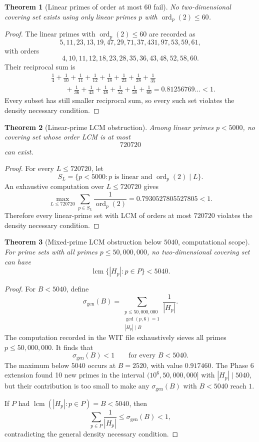 \documentclass[11pt]{article}
\newtheorem{theorem}{Theorem}[section]
\theoremstyle{definition}
\theoremstyle{remark}
\DeclareMathOperator{\ord}{ord}
\DeclareMathOperator{\lcm}{lcm}
\begin{document}
\begin{theorem}[Linear primes of order at most \(60\) fail]
No two-dimensional covering set exists using only linear primes \(p\) with
\(\ord_p(2)\leq 60\).
\end{theorem}

\begin{proof}
The linear primes with \(\ord_p(2)\leq 60\) are recorded as
\[
        5,11,23,13,19,47,29,71,37,431,97,53,59,61,
\]
with orders
\[
        4,10,11,12,18,23,28,35,36,43,48,52,58,60.
\]
Their reciprocal sum is
\[
\begin{aligned}
&\frac14+\frac1{10}+\frac1{11}+\frac1{12}
+\frac1{18}+\frac1{23}+\frac1{28}+\frac1{35} \\
&\qquad
+\frac1{36}+\frac1{43}+\frac1{48}+\frac1{52}
+\frac1{58}+\frac1{60}
        =0.81256769\ldots<1.
\end{aligned}
\]
Every subset has still smaller reciprocal sum, so every such set violates the
density necessary condition.
\end{proof}

\begin{theorem}[Linear-prime LCM obstruction]
Among linear primes \(p<5000\), no covering set whose order LCM is at most
\[
        720720
\]
can exist.
\end{theorem}

\begin{proof}
For every \(L\leq 720720\), let
\[
        S_L=\{p<5000:p\text{ is linear and }\ord_p(2)\mid L\}.
\]
An exhaustive computation over \(L\leq 720720\) gives
\[
        \max_{L\leq 720720}\sum_{p\in S_L}\frac1{\ord_p(2)}
        =
        0.7930527805527805<1.
\]
Therefore every linear-prime set with LCM of orders at most \(720720\) violates
the density necessary condition.
\end{proof}

\begin{theorem}[Mixed-prime LCM obstruction below \(5040\), computational scope]
For prime sets with all primes \(p\leq 50{,}000{,}000\), no two-dimensional covering set
can have
\[
        \lcm\{|H_p|:p\in P\}<5040.
\]
\end{theorem}

\begin{proof}
For \(B<5040\), define
\[
        \sigma_{\mathrm{gen}}(B)
        =
        \sum_{\substack{p\leq 50{,}000{,}000\\ \gcd(p,6)=1\\ |H_p|\mid B}}
        \frac1{|H_p|}.
\]
The computation recorded in the WIT file exhaustively sieves all primes
\(p\leq 50{,}000{,}000\).  It finds that
\[
        \sigma_{\mathrm{gen}}(B)<1
        \qquad\text{for every }B<5040.
\]
The maximum below \(5040\) occurs at \(B=2520\), with value \(0.917460\).  The
Phase 6 extension found 10 new primes in the interval
\((10^6,50{,}000{,}000]\) with \(|H_p|\mid 5040\), but their contribution is
too small to make any \(\sigma_{\mathrm{gen}}(B)\) with \(B<5040\) reach \(1\).

If \(P\) had \(\lcm(|H_p|:p\in P)=B<5040\), then
\[
        \sum_{p\in P}\frac1{|H_p|}
        \leq \sigma_{\mathrm{gen}}(B)<1,
\]
contradicting the general density necessary condition.
\end{proof}
\end{document}
